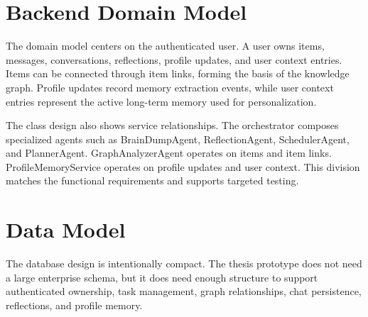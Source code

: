 \section{Backend Domain Model}

The domain model centers on the authenticated user. A user owns items, messages, conversations, reflections, profile updates, and user context entries. Items can be connected through item links, forming the basis of the knowledge graph. Profile updates record memory extraction events, while user context entries represent the active long-term memory used for personalization.


The class design also shows service relationships. The orchestrator composes specialized agents such as BrainDumpAgent, ReflectionAgent, SchedulerAgent, and PlannerAgent. GraphAnalyzerAgent operates on items and item links. ProfileMemoryService operates on profile updates and user context. This division matches the functional requirements and supports targeted testing.

\section{Data Model}

The database design is intentionally compact. The thesis prototype does not need a large enterprise schema, but it does need enough structure to support authenticated ownership, task management, graph relationships, chat persistence, reflections, and profile memory.


